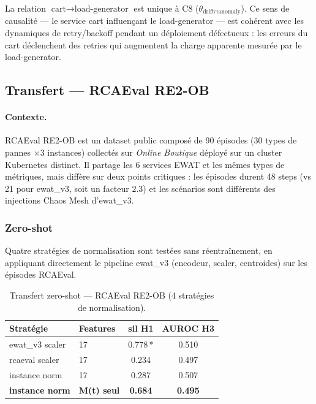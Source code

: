 La relation $\text{cart} \to \text{load-generator}$ est unique à C8
($\theta_{\text{drift} \cap \text{anomaly}}$). Ce sens de causalité --- le service
cart influençant le load-generator --- est cohérent avec les dynamiques de retry/backoff
pendant un déploiement défectueux : les erreurs du cart déclenchent des retries
qui augmentent la charge apparente mesurée par le load-generator.

\subsection{Transfert --- RCAEval RE2-OB}
\label{sec:rcaeval}

\paragraph{Contexte.}
RCAEval RE2-OB est un dataset public composé de 90 épisodes ($30$ types de pannes
$\times 3$ instances) collectés sur \emph{Online Boutique} déployé sur un cluster
Kubernetes distinct. Il partage les 6 services EWAT et les mêmes types de métriques,
mais diffère sur deux points critiques : les épisodes durent 48 steps (vs 21 pour ewat\_v3,
soit un facteur $2.3$) et les scénarios sont différents des injections Chaos Mesh d'ewat\_v3.

\subsubsection{Zero-shot}
\label{sec:rcaeval_zeroshot}

Quatre stratégies de normalisation sont testées sans réentraînement, en appliquant
directement le pipeline ewat\_v3 (encodeur, scaler, centroides) sur les épisodes RCAEval.

\begin{table}[h]
\centering
\caption{Transfert zero-shot --- RCAEval RE2-OB (4 stratégies de normalisation).}
\label{tab:rcaeval_zeroshot}
\begin{tabular}{llcc}
\toprule
\textbf{Stratégie} & \textbf{Features} & \textbf{sil H1} & \textbf{AUROC H3} \\
\midrule
ewat\_v3 scaler  & 17 & 0.778\,* & 0.510 \\
rcaeval scaler   & 17 & 0.234    & 0.497 \\
instance norm    & 17 & 0.287    & 0.507 \\
\textbf{instance norm} & \textbf{M(t) seul} & \textbf{0.684} & \textbf{0.495} \\
\bottomrule
\end{tabular}
\end{table}

